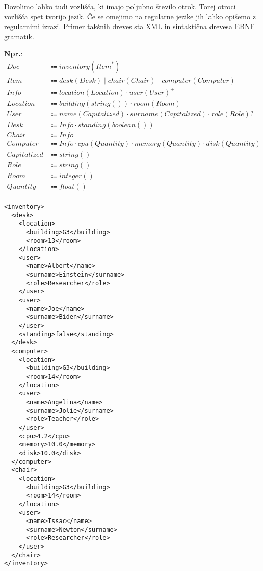 \documentclass{report}
\newcommand{\Ex}{\textbf{Npr.}:\ }
\newcommand{\Seq}{\cdot}
\newcommand{\Union}{\mathrel{|}}
\newcommand{\Kleene}[1]{{#1}^\ast}
\newcommand{\Opt}[1]{#1?}
\newcommand{\KleenePlus}[1]{#1^+}
\newcommand{\Arrow}{\Coloneq}
\begin{document}
Dovolimo lahko tudi vozlišča, ki imajo poljubno število otrok.
Torej otroci vozlišča spet tvorijo jezik.
Če se omejimo na regularne jezike jih lahko opišemo z regularnimi izrazi.
Primer takšnih dreves sta XML in sintaktična drevesa EBNF gramatik.

\Ex
\begin{equation*}
  \begin{aligned}
    Doc &\Arrow inventory(\Kleene{Item})\\
    Item &\Arrow desk(Desk) \Union chair(Chair) \Union computer(Computer) \\
    Info &\Arrow location(Location) \Seq \KleenePlus{user(User)}\\
    Location &\Arrow building(string()) \Seq room(Room)\\
    User &\Arrow name(Capitalized) \Seq surname(Capitalized) \Seq \Opt{role(Role)}\\
    Desk &\Arrow Info \Seq standing(boolean())\\
    Chair &\Arrow Info\\
    Computer &\Arrow Info \Seq cpu(Quantity) \Seq memory(Quantity) \Seq disk(Quantity)\\
    Capitalized &\Arrow string()\\
    Role &\Arrow string()\\
    Room &\Arrow integer()\\
    Quantity &\Arrow float()\\
  \end{aligned}
\end{equation*}
\newpage

\begin{lstlisting}
<inventory>
  <desk>
    <location>
      <building>G3</building>
      <room>13</room>
    </location>
    <user>
      <name>Albert</name>
      <surname>Einstein</surname>
      <role>Researcher</role>
    </user>
    <user>
      <name>Joe</name>
      <surname>Biden</surname>
    </user>
    <standing>false</standing>
  </desk>
  <computer>
    <location>
      <building>G3</building>
      <room>14</room>
    </location>
    <user>
      <name>Angelina</name>
      <surname>Jolie</surname>
      <role>Teacher</role>
    </user>
    <cpu>4.2</cpu>
    <memory>10.0</memory>
    <disk>10.0</disk>
  </computer>
  <chair>
    <location>
      <building>G3</building>
      <room>14</room>
    </location>
    <user>
      <name>Issac</name>
      <surname>Newton</surname>
      <role>Researcher</role>
    </user>
  </chair>
</inventory>
\end{lstlisting}

\printbibliography
\end{document}
